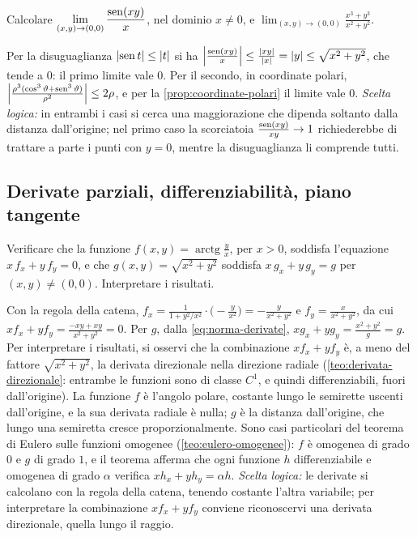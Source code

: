 \begin{esercizio}
Calcolare $\displaystyle\lim_{(x,y)\to(0,0)}\frac{\operatorname{sen}(xy)}{x}$, nel dominio $x\neq0$, e
$\displaystyle\lim_{(x,y)\to(0,0)}\frac{x^{3}+y^{3}}{x^{2}+y^{2}}$.
\begin{soluzione}
Per la disuguaglianza $\lvert \operatorname{sen} t\rvert\le\lvert t\rvert$ si ha
$\Bigl|\frac{\operatorname{sen}(xy)}{x}\Bigr|\le\frac{\lvert xy\rvert}{\lvert x\rvert}=\lvert y\rvert\le\sqrt{x^{2}+y^{2}}$, che tende a $0$:
il primo limite vale $0$. Per il secondo, in coordinate polari,
$\Bigl|\frac{\rho^{3}(\cos^{3}\vartheta+\operatorname{sen}^{3}\vartheta)}{\rho^{2}}\Bigr|\le2\rho$, e per la
\cref{prop:coordinate-polari} il limite vale $0$. \emph{Scelta logica:} in entrambi i
casi si cerca una maggiorazione che dipenda soltanto dalla distanza dall'origine; nel
primo caso la scorciatoia $\frac{\operatorname{sen}(xy)}{xy}\to1$ richiederebbe di trattare a parte i
punti con $y=0$, mentre la disuguaglianza li comprende tutti.
\end{soluzione}
\end{esercizio}

\subsection*{Derivate parziali, differenziabilità, piano tangente}

\begin{esercizio}
Verificare che la funzione $f(x,y)=\operatorname{arctg}\frac yx$, per $x>0$, soddisfa
l'equazione $x\,f_{x}+y\,f_{y}=0$, e che $g(x,y)=\sqrt{x^{2}+y^{2}}$ soddisfa
$x\,g_{x}+y\,g_{y}=g$ per $(x,y)\neq(0,0)$. Interpretare i risultati.
\begin{soluzione}
Con la regola della catena,
$f_{x}=\frac1{1+y^{2}/x^{2}}\cdot\bigl(-\frac y{x^{2}}\bigr)=-\frac{y}{x^{2}+y^{2}}$ e
$f_{y}=\frac{x}{x^{2}+y^{2}}$, da cui $xf_{x}+yf_{y}=\frac{-xy+xy}{x^{2}+y^{2}}=0$. Per $g$, dalla
\eqref{eq:norma-derivate}, $xg_{x}+yg_{y}=\frac{x^{2}+y^{2}}g=g$. Per interpretare i
risultati, si osservi che la combinazione $xf_{x}+yf_{y}$ è, a meno del fattore
$\sqrt{x^{2}+y^{2}}$, la derivata direzionale nella direzione radiale
(\cref{teo:derivata-direzionale}: entrambe le funzioni sono di classe $C^{1}$, e quindi
differenziabili, fuori dall'origine). La funzione $f$ è l'angolo polare, costante lungo
le semirette uscenti dall'origine, e la sua derivata radiale è nulla; $g$ è la distanza
dall'origine, che lungo una semiretta cresce proporzionalmente. Sono casi particolari
del teorema di Eulero sulle funzioni omogenee (\cref{teo:eulero-omogenee}): $f$ è
omogenea di grado $0$ e $g$ di grado $1$, e il teorema afferma che ogni funzione $h$
differenziabile e omogenea di grado $\alpha$ verifica $xh_{x}+yh_{y}=\alpha h$.
\emph{Scelta logica:} le derivate si calcolano con la regola della catena, tenendo
costante l'altra variabile; per interpretare la combinazione $xf_{x}+yf_{y}$ conviene
riconoscervi una derivata direzionale, quella lungo il raggio.
\end{soluzione}
\end{esercizio}

